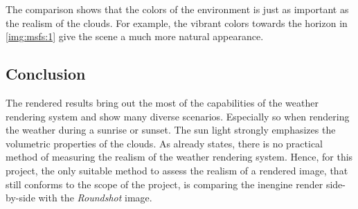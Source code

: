 \noindent
The comparison shows that the colors of the environment is just as important as the realism of the clouds.
For example, the vibrant colors towards the horizon in \autoref{img:msfs:1} give the scene a much more natural appearance.

\subsection{Conclusion}
The rendered results bring out the most of the capabilities of the weather rendering system and show many diverse scenarios.
Especially so when rendering the weather during a sunrise or sunset. The sun light strongly emphasizes the volumetric properties of the clouds.
\emptyline
As  already states, there is no practical method of measuring the realism of the weather rendering system.
Hence, for this project, the only suitable method to assess the realism of a rendered image, that still conforms to the scope of the project, is comparing the \gls{inengine} render side-by-side with the \emph{Roundshot} image.